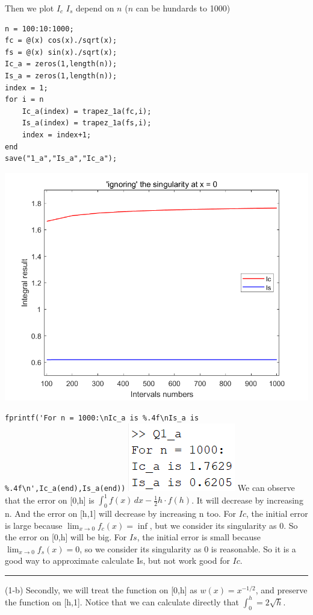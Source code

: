 \documentclass{article}
\begin{document}
\begin{flushleft}
\begin{enumerate}
\begin{framed}
\newpage
Then we plot \(I_{c}\) \(I_{s}\) depend on \(n\) (\(n\) can be hundards to 1000)
\newline
\begin{multicols}{2}
\begin{verbatim}
n = 100:10:1000;
fc = @(x) cos(x)./sqrt(x);
fs = @(x) sin(x)./sqrt(x);
Ic_a = zeros(1,length(n));
Is_a = zeros(1,length(n));
index = 1;
for i = n
    Ic_a(index) = trapez_1a(fc,i);
    Is_a(index) = trapez_1a(fs,i);
    index = index+1;
end
save("1_a","Is_a","Ic_a");
\end{verbatim}
\columnbreak
\includegraphics[width={0.9\linewidth}]{Q1_a.png}
\end{multicols}
\verb|fprintf('For n = 1000:\nIc_a is %.4f\nIs_a is %.4f\n',Ic_a(end),Is_a(end))|
\newline
\includegraphics[width={0.15\linewidth}]{Q1_a_sol.png}
\newline
We can observe that the error on [0,h] is \(\int_{0}^{1} f(x) \,dx - \frac{1}{2}h \cdot f(h)\). It will decrease by increasing n.
\newline
And the error on [h,1] will decrease by increasing n too.
\newline
For \(Ic\), the initial error is large because \(\lim_{x \to 0}f_{c}(x) = \inf\), but we consider its singularity as 0. So the error on [0,h] will be big.
For \(Is\), the initial error is small because \(\lim_{x \to 0}f_{s}(x) = 0\), so we consider its singularity as 0 is reasonable.
\newline
So it is a good way to approximate calculate Is, but not work good for \(Ic\).
\rule[-0.7mm]{45em}{0.5pt}
\newline
(1-b)
\newline
Secondly, we will treat the function on [0,h] as \(w(x) = x^{-1/2}\), and preserve the function on [h,1]. Notice that we can calculate directly that \(\int_{0}^{h}=2\sqrt{h}\).


\end{framed}
\end{enumerate}
\end{flushleft}
\end{document}
